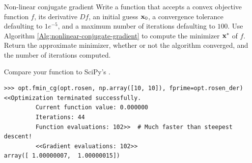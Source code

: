 \begin{problem}{Non-linear conjugate gradient}{}
Write a function that accepts a convex objective function $f$, its derivative $Df$, an initial guess $\mathbf{x}_0$, a convergence tolerance defaulting to $1e^{-5}$, and a maximum number of iterations defaulting to $100$.
Use Algorithm \ref{Alg:nonlinear-conjugate-gradient} to compute the minimizer $\mathbf{x}^*$ of $f$.
Return the approximate minimizer, whether or not the algorithm converged, and the number of iterations computed.

Compare your function to SciPy's .
\begin{lstlisting}
>>> opt.fmin_cg(opt.rosen, np.array([10, 10]), fprime=opt.rosen_der)
<<Optimization terminated successfully.
         Current function value: 0.000000
         Iterations: 44
         Function evaluations: 102>>  # Much faster than steepest descent!
         <<Gradient evaluations: 102>>
array([ 1.00000007,  1.00000015])
\end{lstlisting}
\label{prob:gradientdescent-nonlinear-cg}
\end{problem}


